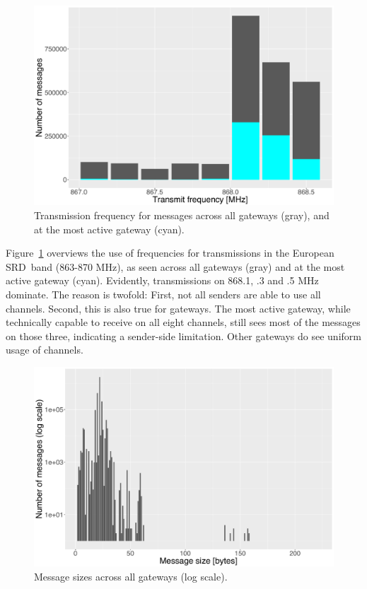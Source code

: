 \begin{figure}
  \centering
  \includegraphics[width=\columnwidth]{figures/qrg.pdf}
  \caption{Transmission frequency for messages across all gateways (gray), and at the most active gateway (cyan).}
  \label{fig:qrg}
\end{figure}

Figure~\ref{fig:qrg} overviews the use of frequencies for transmissions
in the European \gls{SRD} band (863-870 MHz), as seen across all
gateways (gray) and at the most active gateway (cyan).
Evidently, transmissions on 868.1, .3 and .5 MHz dominate. The reason
is twofold: First, not all senders are able to use all channels.
Second, this is also true for gateways. The most active gateway,
while technically capable to receive on all eight channels, still
sees most of the messages on those three, indicating a sender-side
limitation. Other gateways do see uniform usage of channels.

\begin{figure}
  \centering
  \includegraphics[width=\columnwidth]{figures/sizes.pdf}
  \caption{Message sizes across all gateways (log scale).}
  \label{fig:sizes}
\end{figure}

